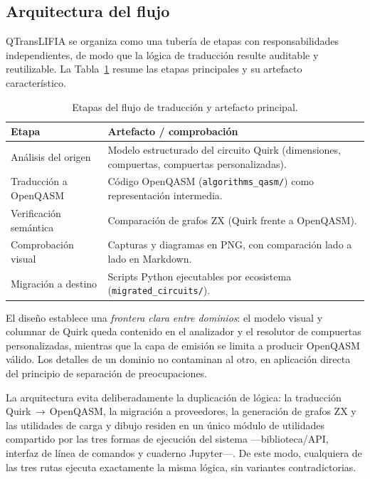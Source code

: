\documentclass[11pt,a4paper]{article}
\newcommand{\code}[1]{\texttt{#1}}
\begin{document}
\subsection{Arquitectura del flujo}

QTransLIFIA se organiza como una tubería de etapas con responsabilidades independientes, de
modo que la lógica de traducción resulte auditable y reutilizable. La Tabla~\ref{tab:pipeline}
resume las etapas principales y su artefacto característico.

\begin{table}[htbp]
\centering
\small
\caption{Etapas del flujo de traducción y artefacto principal.}
\label{tab:pipeline}
\begin{tabular}{@{}p{}p{}@{}}
\toprule
\textbf{Etapa} & \textbf{Artefacto / comprobación} \\
\midrule
Análisis del origen & Modelo estructurado del circuito Quirk (dimensiones, compuertas, compuertas personalizadas). \\
Traducción a OpenQASM & Código OpenQASM (\code{algorithms\_qasm/}) como representación intermedia. \\
Verificación semántica & Comparación de grafos ZX (Quirk frente a OpenQASM). \\
Comprobación visual & Capturas y diagramas en PNG, con comparación lado a lado en Markdown. \\
Migración a destino & Scripts Python ejecutables por ecosistema (\code{migrated\_circuits/}). \\
\bottomrule
\end{tabular}
\end{table}

El diseño establece una \emph{frontera clara entre dominios}: el modelo visual y columnar de
Quirk queda contenido en el analizador y el resolutor de compuertas personalizadas,
mientras que la capa de emisión se limita a producir OpenQASM válido. Los detalles de un
dominio no contaminan al otro, en aplicación directa del principio de separación de
preocupaciones.

La arquitectura evita deliberadamente la duplicación de lógica: la traducción
Quirk\,$\rightarrow$\,OpenQASM, la migración a proveedores, la generación de grafos ZX y las
utilidades de carga y dibujo residen en un único módulo de utilidades compartido por las
tres formas de ejecución del sistema ---biblioteca/API, interfaz de línea de comandos y
cuaderno Jupyter---. De este modo, cualquiera de las tres rutas ejecuta exactamente la misma
lógica, sin variantes contradictorias.
\end{document}
